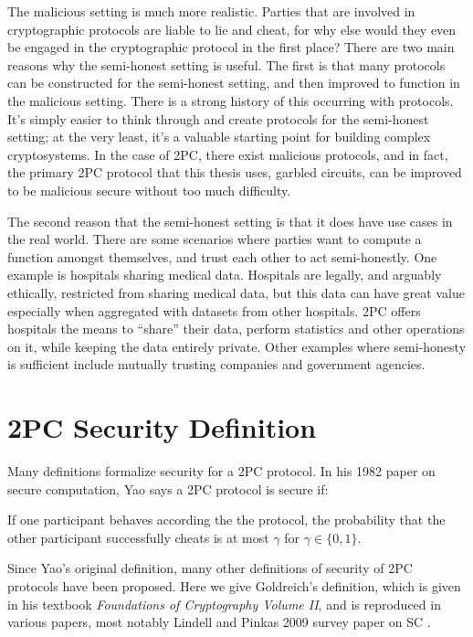 The malicious setting is much more realistic. 
Parties that are involved in cryptographic protocols are liable to lie and cheat, for why else would they even be engaged in the cryptographic protocol in the first place?
There are two main reasons why the semi-honest setting is useful.
The first is that many protocols can be constructed for the semi-honest setting, and then improved to function in the malicious setting.
There is a strong history of this occurring with protocols.
It's simply easier to think through and create protocols for the semi-honest setting; at the very least, it's a valuable starting point for building complex cryptosystems.
In the case of 2PC, there exist malicious protocols, and in fact, the primary 2PC protocol that this thesis uses, garbled circuits, can be improved to be malicious secure without too much difficulty. 

The second reason that the semi-honest setting is that it does have use cases in the real world.
There are some scenarios where parties want to compute a function amongst themselves, and trust each other to act semi-honestly.
One example is hospitals sharing medical data.
Hospitals are legally, and arguably ethically, restricted from sharing medical data, but this data can have great value especially when aggregated with datasets from other hospitals.
2PC offers hospitals the means to ``share'' their data, perform statistics and other operations on it, while keeping the data entirely private. 
Other examples where semi-honesty is sufficient include mutually trusting companies and government agencies.

\section{2PC Security Definition}
Many definitions formalize security for a 2PC protocol.
In his 1982 paper on secure computation, Yao says a 2PC protocol is secure if:

\begin{blockquote}
If one participant behaves according the the protocol, the probability that the other participant successfully cheats is at most $\gamma$ for $\gamma \in \{0,1\}$.
\cite{get-source}
\end{blockquote}


Since Yao's original definition, many other definitions of security of 2PC protocols have been proposed.
Here we give Goldreich's definition, which is given in his textbook \textit{Foundations of Cryptography Volume II}, and is reproduced in various papers, most notably Lindell and Pinkas 2009 survey paper on SC \cite{goldreich, lindell2009secure}.

